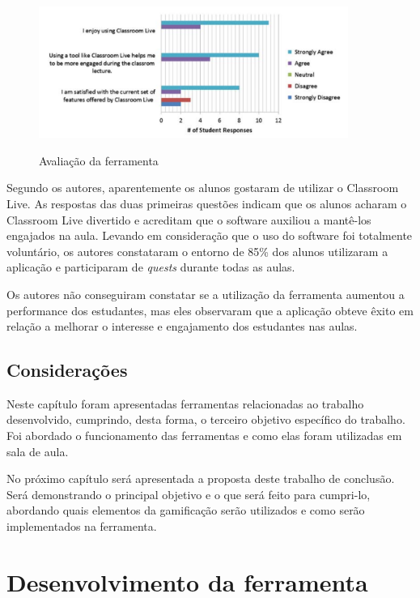 \documentclass[
	12pt,				%
	oneside,			%
	a4paper,			%
	english,			%
	french,				%
	spanish,			%
	brazil,				%
	]{abntex2}
\begin{document}
\begin{figure}[ht]
\centering
\caption{Avaliação da ferramenta}
\includegraphics[width=0.9\textwidth]{imagens/classroom_avaliacao.png}
\label{fig:classroom_avaliacao}
\end{figure}

Segundo os autores, aparentemente os alunos gostaram de utilizar o Classroom Live. As respostas das duas primeiras questões indicam que os alunos acharam o Classroom Live divertido e acreditam que o software auxiliou a mantê-los engajados na aula. Levando em consideração que o uso do software foi totalmente voluntário, os autores constataram o entorno de 85\% dos alunos utilizaram a aplicação e participaram de \textit{quests} durante todas as aulas. 

Os autores não conseguiram constatar se a utilização da ferramenta aumentou a performance dos estudantes, mas eles observaram que a aplicação obteve êxito em relação a melhorar o interesse e engajamento dos estudantes nas aulas.

\section{Considerações}
Neste capítulo foram apresentadas ferramentas relacionadas ao trabalho desenvolvido, cumprindo, desta forma, o terceiro objetivo específico do trabalho. Foi abordado o funcionamento das ferramentas e como elas foram utilizadas em sala de aula.

No próximo capítulo será apresentada a proposta deste trabalho de conclusão. Será demonstrando o principal objetivo e o que será feito para cumpri-lo, abordando quais elementos da gamificação serão utilizados e como serão implementados na ferramenta.

\chapter{Desenvolvimento da ferramenta} 
\end{document}
